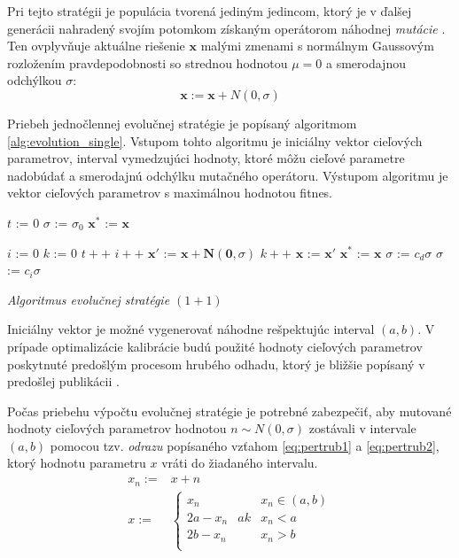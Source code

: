 \documentclass[12pt, a4paper]{article}
\providecommand{\dontprintsemicolon}{\DontPrintSemicolon}
\begin{document}
Pri tejto stratégii je populácia tvorená jediným jedincom, ktorý je v ďalšej generácii nahradený svojím potomkom získaným operátorom náhodnej \emph{mutácie} \cite{kvasnicka}. Ten ovplyvňuje aktuálne riešenie $\mathbf{x}$ malými zmenami s normálnym Gaussovým rozložením pravdepodobnosti so strednou hodnotou $\mu = 0$ a smerodajnou odchýlkou $\sigma$:
\begin{equation}
	\mathbf{x} := \mathbf{x} + N(0,\sigma)
\end{equation}

Priebeh jednočlennej evolučnej stratégie je popísaný algoritmom \ref{alg:evolution_single}. Vstupom tohto algoritmu je iniciálny vektor cieľových parametrov, interval vymedzujúci hodnoty, ktoré môžu cieľové parametre nadobúdať a smerodajnú odchýlku mutačného operátoru. Výstupom algoritmu je vektor cieľových parametrov s maximálnou hodnotou fitnes.

\begin{algorithm}[h]
	\dontprintsemicolon
	\BlankLine
	
	$t$ := $0$\;
	$\sigma$ := $\sigma_0$\;
	$\mathbf{x^*}$ := $\mathbf{x}$\;	
	
	{
		$i$ := $0$\;
		$k$ := $0$\;
		$t++$\;
		{
			$i++$\;
			$\mathbf{x'}$ := $\mathbf{x} + \mathbf{N}(\mathbf{0}, \sigma)$\;
			{
				$k++$\;
				$\mathbf{x}$ := $\mathbf{x'}$\;
				{
					$\mathbf{x^*}$ := $\mathbf{x}$\;	
				}
			}
			{
				$\sigma$ := $c_d\sigma$\;
			} 
			{
				$\sigma$ := $c_i\sigma$\;
			}
		}
	}

	\caption{\emph{Algoritmus evolučnej stratégie $(1+1)$} \cite{kvasnicka}\label{alg:evolution_single}}
\end{algorithm} 

Iniciálny vektor je možné vygenerovať náhodne rešpektujúc interval $(a,b)$. V prípade optimalizácie kalibrácie budú použité hodnoty cieľových parametrov poskytnuté predošlým procesom hrubého odhadu, ktorý je bližšie popísaný v predošlej publikácii \cite{velas}.

Počas priebehu výpočtu evolučnej stratégie je potrebné  zabezpečiť, aby mutované hodnoty cieľových parametrov hodnotou $n \sim N(0,\sigma)$ zostávali v intervale $(a,b)$ pomocou tzv. \emph{odrazu} popísaného vzťahom \ref{eq:pertrub1} a \ref{eq:pertrub2}, ktorý hodnotu parametru $x$ vráti do žiadaného intervalu.
\begin{eqnarray}
	x_n :=& x + n \label{eq:pertrub1}\\
	x :=& \left\{ \begin{array}{lcl}
	x_n      &    & x_n \in (a,b) \\
	2a - x_n & ak & x_n < a \\
	2b - x_n &    & x_n > b \\
	\end{array}\right.\label{eq:pertrub2}
\end{eqnarray}
\end{document}
